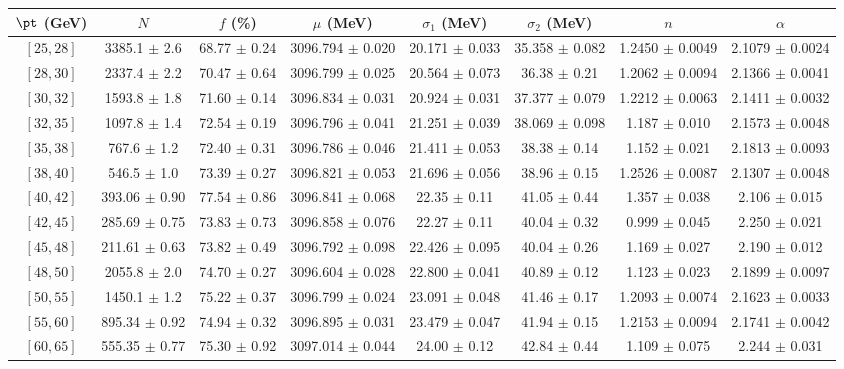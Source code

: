 \begin{tabular}{c||c|c|c|c|c|c|c}
$\pt$ (GeV) & $N$ & $f$ (\%) & $\mu$ (MeV) & $\sigma_1$ (MeV) & $\sigma_2$ (MeV) & $n$ & $\alpha$ \\
\hline
$[25, 28]$ & 3385.1 $\pm$ 2.6 & 68.77 $\pm$ 0.24 & 3096.794 $\pm$ 0.020 & 20.171 $\pm$ 0.033 & 35.358 $\pm$ 0.082 & 1.2450 $\pm$ 0.0049 & 2.1079 $\pm$ 0.0024\\
$[28, 30]$ & 2337.4 $\pm$ 2.2 & 70.47 $\pm$ 0.64 & 3096.799 $\pm$ 0.025 & 20.564 $\pm$ 0.073 & 36.38 $\pm$ 0.21 & 1.2062 $\pm$ 0.0094 & 2.1366 $\pm$ 0.0041\\
$[30, 32]$ & 1593.8 $\pm$ 1.8 & 71.60 $\pm$ 0.14 & 3096.834 $\pm$ 0.031 & 20.924 $\pm$ 0.031 & 37.377 $\pm$ 0.079 & 1.2212 $\pm$ 0.0063 & 2.1411 $\pm$ 0.0032\\
$[32, 35]$ & 1097.8 $\pm$ 1.4 & 72.54 $\pm$ 0.19 & 3096.796 $\pm$ 0.041 & 21.251 $\pm$ 0.039 & 38.069 $\pm$ 0.098 & 1.187 $\pm$ 0.010 & 2.1573 $\pm$ 0.0048\\
$[35, 38]$ & 767.6 $\pm$ 1.2 & 72.40 $\pm$ 0.31 & 3096.786 $\pm$ 0.046 & 21.411 $\pm$ 0.053 & 38.38 $\pm$ 0.14 & 1.152 $\pm$ 0.021 & 2.1813 $\pm$ 0.0093\\
$[38, 40]$ & 546.5 $\pm$ 1.0 & 73.39 $\pm$ 0.27 & 3096.821 $\pm$ 0.053 & 21.696 $\pm$ 0.056 & 38.96 $\pm$ 0.15 & 1.2526 $\pm$ 0.0087 & 2.1307 $\pm$ 0.0048\\
$[40, 42]$ & 393.06 $\pm$ 0.90 & 77.54 $\pm$ 0.86 & 3096.841 $\pm$ 0.068 & 22.35 $\pm$ 0.11 & 41.05 $\pm$ 0.44 & 1.357 $\pm$ 0.038 & 2.106 $\pm$ 0.015\\
$[42, 45]$ & 285.69 $\pm$ 0.75 & 73.83 $\pm$ 0.73 & 3096.858 $\pm$ 0.076 & 22.27 $\pm$ 0.11 & 40.04 $\pm$ 0.32 & 0.999 $\pm$ 0.045 & 2.250 $\pm$ 0.021\\
$[45, 48]$ & 211.61 $\pm$ 0.63 & 73.82 $\pm$ 0.49 & 3096.792 $\pm$ 0.098 & 22.426 $\pm$ 0.095 & 40.04 $\pm$ 0.26 & 1.169 $\pm$ 0.027 & 2.190 $\pm$ 0.012\\
$[48, 50]$ & 2055.8 $\pm$ 2.0 & 74.70 $\pm$ 0.27 & 3096.604 $\pm$ 0.028 & 22.800 $\pm$ 0.041 & 40.89 $\pm$ 0.12 & 1.123 $\pm$ 0.023 & 2.1899 $\pm$ 0.0097\\
$[50, 55]$ & 1450.1 $\pm$ 1.2 & 75.22 $\pm$ 0.37 & 3096.799 $\pm$ 0.024 & 23.091 $\pm$ 0.048 & 41.46 $\pm$ 0.17 & 1.2093 $\pm$ 0.0074 & 2.1623 $\pm$ 0.0033\\
$[55, 60]$ & 895.34 $\pm$ 0.92 & 74.94 $\pm$ 0.32 & 3096.895 $\pm$ 0.031 & 23.479 $\pm$ 0.047 & 41.94 $\pm$ 0.15 & 1.2153 $\pm$ 0.0094 & 2.1741 $\pm$ 0.0042\\
$[60, 65]$ & 555.35 $\pm$ 0.77 & 75.30 $\pm$ 0.92 & 3097.014 $\pm$ 0.044 & 24.00 $\pm$ 0.12 & 42.84 $\pm$ 0.44 & 1.109 $\pm$ 0.075 & 2.244 $\pm$ 0.031\\

\end{tabular}
